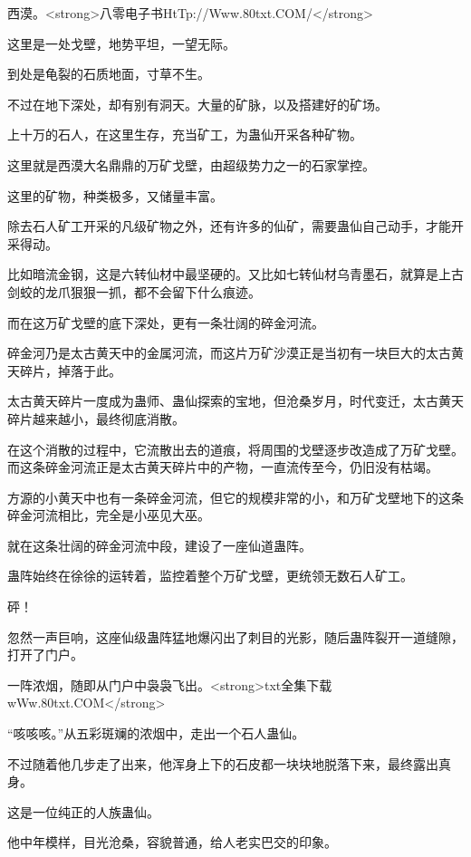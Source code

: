 
\begin{this_body}

西漠。<strong>八零电子书HtTp://Www.80txt.COM/</strong>

这里是一处戈壁，地势平坦，一望无际。

到处是龟裂的石质地面，寸草不生。

不过在地下深处，却有别有洞天。大量的矿脉，以及搭建好的矿场。

上十万的石人，在这里生存，充当矿工，为蛊仙开采各种矿物。

这里就是西漠大名鼎鼎的万矿戈壁，由超级势力之一的石家掌控。

这里的矿物，种类极多，又储量丰富。

除去石人矿工开采的凡级矿物之外，还有许多的仙矿，需要蛊仙自己动手，才能开采得动。

比如暗流金钢，这是六转仙材中最坚硬的。又比如七转仙材乌青墨石，就算是上古剑蛟的龙爪狠狠一抓，都不会留下什么痕迹。

而在这万矿戈壁的底下深处，更有一条壮阔的碎金河流。

碎金河乃是太古黄天中的金属河流，而这片万矿沙漠正是当初有一块巨大的太古黄天碎片，掉落于此。

太古黄天碎片一度成为蛊师、蛊仙探索的宝地，但沧桑岁月，时代变迁，太古黄天碎片越来越小，最终彻底消散。

在这个消散的过程中，它流散出去的道痕，将周围的戈壁逐步改造成了万矿戈壁。而这条碎金河流正是太古黄天碎片中的产物，一直流传至今，仍旧没有枯竭。

方源的小黄天中也有一条碎金河流，但它的规模非常的小，和万矿戈壁地下的这条碎金河流相比，完全是小巫见大巫。

就在这条壮阔的碎金河流中段，建设了一座仙道蛊阵。

蛊阵始终在徐徐的运转着，监控着整个万矿戈壁，更统领无数石人矿工。

砰！

忽然一声巨响，这座仙级蛊阵猛地爆闪出了刺目的光影，随后蛊阵裂开一道缝隙，打开了门户。

一阵浓烟，随即从门户中袅袅飞出。<strong>txt全集下载wWw.80txt.COM</strong>

“咳咳咳。”从五彩斑斓的浓烟中，走出一个石人蛊仙。

不过随着他几步走了出来，他浑身上下的石皮都一块块地脱落下来，最终露出真身。

这是一位纯正的人族蛊仙。

他中年模样，目光沧桑，容貌普通，给人老实巴交的印象。


\end{this_body}
